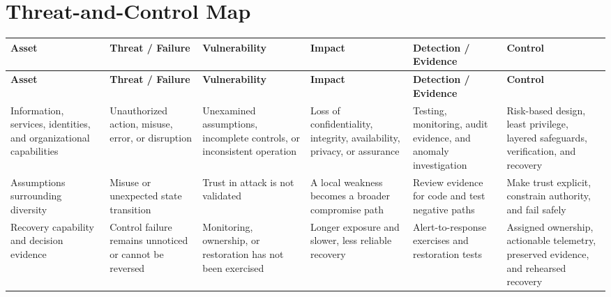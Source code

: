 \documentclass[11pt,letterpaper]{article}
\begin{document}
\section*{Threat-and-Control Map}
\begingroup\scriptsize\setlength{\tabcolsep}{2pt}
\begin{longtable}{>{\raggedright\arraybackslash}p{}>{\raggedright\arraybackslash}p{}>{\raggedright\arraybackslash}p{}>{\raggedright\arraybackslash}p{}>{\raggedright\arraybackslash}p{}>{\raggedright\arraybackslash}p{}}
\toprule\rowcolor{Navy}\color{white}\textbf{Asset} & \color{white}\textbf{Threat / Failure} & \color{white}\textbf{Vulnerability} & \color{white}\textbf{Impact} & \color{white}\textbf{Detection / Evidence} & \color{white}\textbf{Control}\\\midrule
\endfirsthead
\toprule\rowcolor{Navy}\color{white}\textbf{Asset} & \color{white}\textbf{Threat / Failure} & \color{white}\textbf{Vulnerability} & \color{white}\textbf{Impact} & \color{white}\textbf{Detection / Evidence} & \color{white}\textbf{Control}\\\midrule
\endhead
Information, services, identities, and organizational capabilities & Unauthorized action, misuse, error, or disruption & Unexamined assumptions, incomplete controls, or inconsistent operation & Loss of confidentiality, integrity, availability, privacy, or assurance & Testing, monitoring, audit evidence, and anomaly investigation & Risk-based design, least privilege, layered safeguards, verification, and recovery\\\midrule
Assumptions surrounding diversity & Misuse or unexpected state transition & Trust in attack is not validated & A local weakness becomes a broader compromise path & Review evidence for code and test negative paths & Make trust explicit, constrain authority, and fail safely\\\midrule
Recovery capability and decision evidence & Control failure remains unnoticed or cannot be reversed & Monitoring, ownership, or restoration has not been exercised & Longer exposure and slower, less reliable recovery & Alert-to-response exercises and restoration tests & Assigned ownership, actionable telemetry, preserved evidence, and rehearsed recovery\\\midrule
\bottomrule
\end{longtable}
\endgroup
\end{document}
